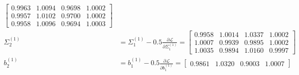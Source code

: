 \documentclass[11pt,a4paper]{article}
\def\mathbf#1{#1}%
\theoremstyle{plain}
\theoremstyle{definition}
\theoremstyle{remark}
\begin{document}
\begin{enumerate}
\begin{align}
\begin{bmatrix}
            0.9963 & 1.0094 & 0.9698 & 1.0002 \\
            0.9957 & 1.0102 & 0.9700 & 1.0002 \\
            0.9958 & 1.0096 & 0.9694 & 1.0003
        \end{bmatrix} \\[0.2em]
        \Sigma^{(1)}_2 &= \Sigma^{(1)}_1 - 0.5 \frac{\partial \mathcal{L}}{\partial \Sigma^{(1)}_1} = \begin{bmatrix}
            0.9958 & 1.0014 & 1.0337 & 1.0002 \\
            1.0007 & 0.9939 & 0.9895 & 1.0002 \\
            1.0035 & 0.9894 & 1.0160 & 0.9997
        \end{bmatrix} \\[0.2em]
        \mathbf{b}^{(1)}_2 &= \mathbf{b}^{(1)}_1 - 0.5 \frac{\partial \mathcal{L}}{\partial \mathbf{b}^{(1)}_1} = \begin{bmatrix} 0.9861 & 1.0320 & 0.9003 & 1.0007 \end{bmatrix}
    \end{align}
\end{enumerate}
\end{document}
